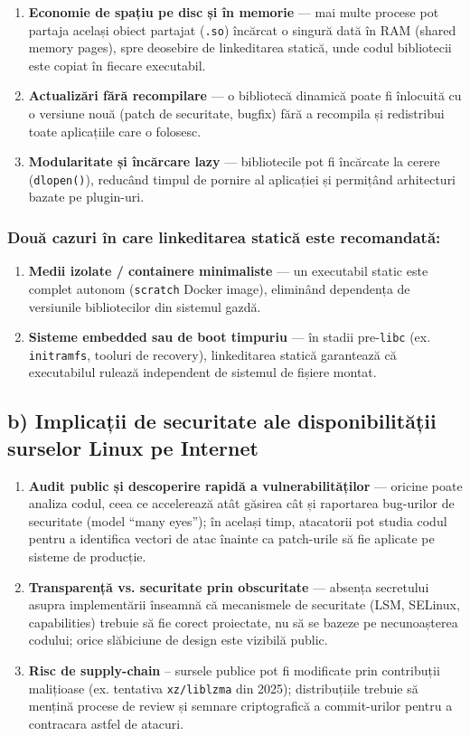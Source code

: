 \documentclass[11pt]{article}
\begin{document}
\begin{enumerate}
\item \textbf{Economie de spațiu pe disc și în memorie} --- mai multe procese pot partaja același obiect partajat (\texttt{.so}) încărcat o singură dată în RAM (shared memory pages), spre deosebire de linkeditarea statică, unde codul bibliotecii este copiat în fiecare executabil.
\item \textbf{Actualizări fără recompilare} --- o bibliotecă dinamică poate fi înlocuită cu o versiune nouă (patch de securitate, bugfix) fără a recompila și redistribui toate aplicațiile care o folosesc.
\item \textbf{Modularitate și încărcare lazy} --- bibliotecile pot fi încărcate la cerere (\texttt{dlopen()}), reducând timpul de pornire al aplicației și permițând arhitecturi bazate pe plugin-uri.
\end{enumerate}
\subsubsection{Două cazuri în care linkeditarea statică este recomandată:}
\label{sec:org94f3b80}

\begin{enumerate}
\item \textbf{Medii izolate / containere minimaliste} --- un executabil static este complet autonom (\texttt{scratch} Docker image), eliminând dependența de versiunile bibliotecilor din sistemul gazdă.
\item \textbf{Sisteme embedded sau de boot timpuriu} --- în stadii pre-\texttt{libc} (ex. \texttt{initramfs}, tooluri de recovery), linkeditarea statică garantează că executabilul rulează independent de sistemul de fișiere montat.
\end{enumerate}
\subsection{b) Implicații de securitate ale disponibilității surselor Linux pe Internet}
\label{sec:orgabfdf63}

\begin{enumerate}
\item \textbf{Audit public și descoperire rapidă a vulnerabilităților} --- oricine poate analiza codul, ceea ce accelerează atât găsirea cât și raportarea bug-urilor de securitate (model ``many eyes''); în același timp, atacatorii pot studia codul pentru a identifica vectori de atac înainte ca patch-urile să fie aplicate pe sisteme de producție.
\item \textbf{Transparență vs. securitate prin obscuritate} --- absența secretului asupra implementării înseamnă că mecanismele de securitate (LSM, SELinux, capabilities) trebuie să fie corect proiectate, nu să se bazeze pe necunoașterea codului; orice slăbiciune de design este vizibilă public.
\item \textbf{Risc de supply-chain} – sursele publice pot fi modificate prin contribuții malițioase (ex. tentativa \texttt{xz/liblzma} din 2025); distribuțiile trebuie să mențină procese de review și semnare criptografică a commit-urilor pentru a contracara astfel de atacuri.
\end{enumerate}
\end{document}
